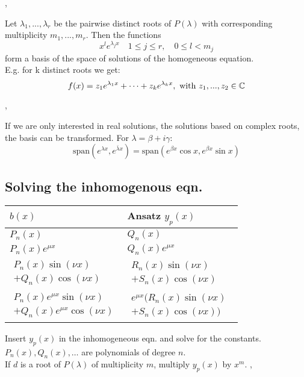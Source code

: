 \sep

\Theorem Let $\lambda_1, ..., \lambda_r$ be the pairwise distinct roots of $P(\lambda)$ with corresponding multiplicity $m_1, ..., m_r$.
Then the functions
$$x^{l}  e^{\lambda_j x} \quad 1 \leq j \leq r, \quad 0 \leq l < m_j$$
form a basis of the space of solutions of the homogeneous equation. \\
E.g. for k distinct roots we get:
$$ f(x) = z_1 e^{\lambda_1 x} + \cdots + z_k e^{\lambda_k x}, \text{ with }  z_1, ..., z_2 \in \mathbb{C} $$

\sep

\Remark If we are only interested in real solutions, the solutions based on complex roots, the basis can be transformed. For $\lambda=\beta + i\gamma$:
$$ \text{span}(e^{\lambda x}, e^{\bar{\lambda}x}) =
   \text{span}(e^{\beta x} \cos{x}, e^{\beta x} \sin{x})$$
   
\subsection{Solving the inhomogenous eqn.}
\Procedure[Ansatz]
\begin{table}[H]
  \begin{center}
    \begin{tabular}{l|l}
      $b(x)$ & Ansatz $y_p(x)$ \\
      \hline
      
      $P_n(x)$ & $Q_n(x)$ \\
      $P_n(x)e^{\mu x}$ & $Q_n(x)e^{\mu x}$\\
      \hline
      
      $\begin{matrix}
      P_n(x) \sin(\nu x) \\ + 
      Q_n(x)\cos(\nu x)
      \end{matrix}$ 
      & $\begin{matrix}R_n(x)\sin(\nu x)\qquad\\ 
      + S_n(x)\cos(\nu x)\end{matrix}$ \\
      \hline
      
      $\begin{matrix}P_n(x)e^{\mu x}\sin(\nu x) \\
       + Q_n(x)e^{\mu x}\cos(\nu x)\end{matrix} $
      & $\begin{matrix}e^{\mu x}(R_n(x)\sin(\nu x) \\ + S_n(x)\cos(\nu x))\end{matrix}$
    \end{tabular}
  \end{center}
\end{table}
Insert $y_p(x)$ in the inhomogeneous eqn. and solve for the constants. $P_n(x), Q_n(x), \dots$ are polynomials of degree $n$. \\
\Remark If $d$ is a root of $P(\lambda)$ of multiplicity $m$, multiply $y_p(x)$ by $x^m$.
\sep
{} 